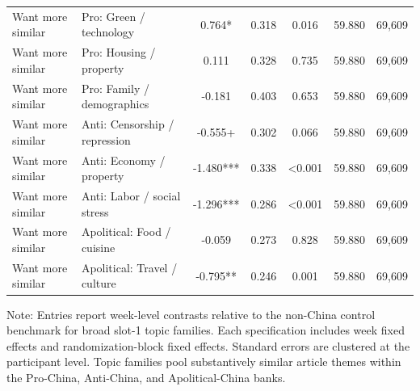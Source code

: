 \begin{table}[H]
\begin{threeparttable}
\begin{tabular}{llccccc}
Want more similar & Pro: Green / technology & 0.764* & 0.318 & 0.016 & 59.880 & 69,609 \\
Want more similar & Pro: Housing / property & 0.111 & 0.328 & 0.735 & 59.880 & 69,609 \\
Want more similar & Pro: Family / demographics & -0.181 & 0.403 & 0.653 & 59.880 & 69,609 \\
Want more similar & Anti: Censorship / repression & -0.555+ & 0.302 & 0.066 & 59.880 & 69,609 \\
Want more similar & Anti: Economy / property & -1.480*** & 0.338 & <0.001 & 59.880 & 69,609 \\
Want more similar & Anti: Labor / social stress & -1.296*** & 0.286 & <0.001 & 59.880 & 69,609 \\
Want more similar & Apolitical: Food / cuisine & -0.059 & 0.273 & 0.828 & 59.880 & 69,609 \\
Want more similar & Apolitical: Travel / culture & -0.795** & 0.246 & 0.001 & 59.880 & 69,609 \\
\bottomrule
\end{tabular}
\begin{tablenotes}[flushleft]
\footnotesize
\item Note: Entries report week-level contrasts relative to the non-China control benchmark for broad slot-1 topic families. Each specification includes week fixed effects and randomization-block fixed effects. Standard errors are clustered at the participant level. Topic families pool substantively similar article themes within the Pro-China, Anti-China, and Apolitical-China banks.
\end{tablenotes}
\end{threeparttable}
\end{table}
